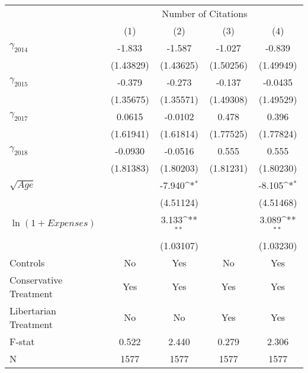 \def\sym#1{\ifmmode^{#1}\else\(^{#1}\)\fi}
\setlength\tabcolsep{17pt}
\begin{tabular}{@{\extracolsep{7pt}}lcccc}
\toprule
                    &\multicolumn{4}{c}{Number of Citations}                                                \\\cmidrule(lr){2-5}
                    &\multicolumn{1}{c}{(1)}         &\multicolumn{1}{c}{(2)}         &\multicolumn{1}{c}{(3)}         &\multicolumn{1}{c}{(4)}         \\
\midrule
\large $\gamma_{2014}$&      -1.833         &      -1.587         &      -1.027         &      -0.839         \\
                    &   (1.43829)         &   (1.43625)         &   (1.50256)         &   (1.49949)         \\
\addlinespace
\large $\gamma_{2015}$&      -0.379         &      -0.273         &      -0.137         &     -0.0435         \\
                    &   (1.35675)         &   (1.35571)         &   (1.49308)         &   (1.49529)         \\
\addlinespace
\large $\gamma_{2017}$&      0.0615         &     -0.0102         &       0.478         &       0.396         \\
                    &   (1.61941)         &   (1.61814)         &   (1.77525)         &   (1.77824)         \\
\addlinespace
\large $\gamma_{2018}$&     -0.0930         &     -0.0516         &       0.555         &       0.555         \\
                    &   (1.81383)         &   (1.80203)         &   (1.81231)         &   (1.80230)         \\
\addlinespace
$\sqrt{Age}$        &                     &      -7.940\sym{*}  &                     &      -8.105\sym{*}  \\
                    &                     &   (4.51124)         &                     &   (4.51468)         \\
\addlinespace
\small $\ln(1+Expenses)$&                     &       3.133\sym{**} &                     &       3.089\sym{**} \\
                    &                     &   (1.03107)         &                     &   (1.03230)         \\
\midrule
Controls            &          No         &         Yes         &          No         &         Yes         \\
Conservative Treatment&         Yes         &         Yes         &         Yes         &         Yes         \\
Libertarian Treatment&          No         &          No         &         Yes         &         Yes         \\
F-stat              &       0.522         &       2.440         &       0.279         &       2.306         \\
N                   &        1577         &        1577         &        1577         &        1577         \\
\bottomrule
\end{tabular}
